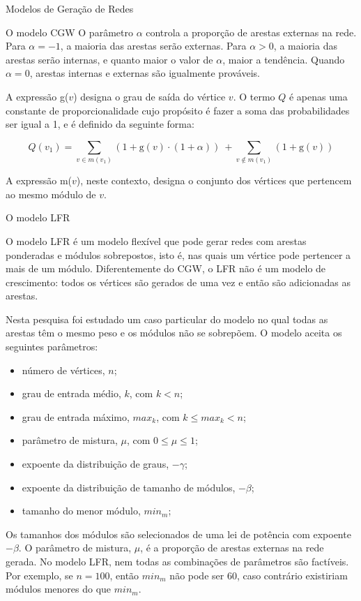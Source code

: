 \begin{section}{Modelos de Geração de Redes}
\begin{subsection}{O modelo CGW}
O parâmetro $\alpha$ controla a proporção de arestas externas na rede. Para $\alpha = -1$, a maioria das arestas serão externas. Para $\alpha > 0$, a maioria das arestas serão internas, e quanto maior o valor de $\alpha$, maior a tendência. Quando $\alpha = 0$, arestas internas e externas são igualmente prováveis.

A expressão g($v$) designa o grau de saída do vértice $v$. O termo $Q$ é apenas uma constante de proporcionalidade cujo propósito é fazer a soma das probabilidades ser igual a 1, e é definido da seguinte forma:

$$
Q(v_1) = \sum_{v \in m(v_1)} (1 + \mathrm{g}(v) \cdot (1 + \alpha))
~+ \sum_{v \notin m(v_1)} (1 + \mathrm{g}(v))
$$

A expressão m($v$), neste contexto, designa o conjunto dos vértices que pertencem ao mesmo módulo de $v$.

\end{subsection}

\begin{subsection}{O modelo LFR}

O modelo LFR \cite{Lancichinetti2008,Lancichinetti2009} é um modelo flexível que pode gerar redes com arestas ponderadas e módulos sobrepostos, isto é, nas quais um vértice pode pertencer a mais de um módulo. Diferentemente do CGW, o LFR não é um modelo de crescimento: todos os vértices são gerados de uma vez e então são adicionadas as arestas.

Nesta pesquisa foi estudado um caso particular do modelo no qual todas as arestas têm o mesmo peso e os módulos não se sobrepõem. O modelo aceita os seguintes parâmetros:

\begin{itemize}
\item número de vértices, $n$;
\item grau de entrada médio, $k$, com $k < n$;
\item grau de entrada máximo, $max_k$, com $k \le max_k < n$;
\item parâmetro de mistura, $\mu$, com $0 \le \mu \le 1$;
\item expoente da distribuição de graus, $-\gamma$;
\item expoente da distribuição de tamanho de módulos, $-\beta$;
\item tamanho do menor módulo, $min_m$;
\end{itemize}

Os tamanhos dos módulos são selecionados de uma lei de potência com expoente $-\beta$. O parâmetro de mistura, $\mu$, é a proporção de arestas externas na rede gerada. No modelo LFR, nem todas as combinações de parâmetros são factíveis. Por exemplo, se $n = 100$, então $min_m$ não pode ser 60, caso contrário existiriam módulos menores do que $min_m$.


\end{subsection}
\end{section}
